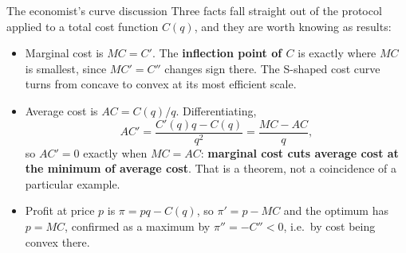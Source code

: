 \begin{rulebox}{The economist's curve discussion}
Three facts fall straight out of the protocol applied to a total cost
function $C(q)$, and they are worth knowing as results:
\begin{itemize}[leftmargin=1.6em,itemsep=0.4ex]
  \item Marginal cost is $MC=C'$. The \textbf{inflection point of $C$} is
        exactly where $MC$ is smallest, since $MC'=C''$ changes sign there.
        The S-shaped cost curve turns from concave to convex at its most
        efficient scale.
  \item Average cost is $AC=C(q)/q$. Differentiating,
        \[
          AC'=\frac{C'(q)q-C(q)}{q^{2}}=\frac{MC-AC}{q},
        \]
        so $AC'=0$ exactly when $MC=AC$: \textbf{marginal cost cuts average
        cost at the minimum of average cost}. That is a theorem, not a
        coincidence of a particular example.
  \item Profit at price $p$ is $\pi=pq-C(q)$, so $\pi'=p-MC$ and the
        optimum has $p=MC$, confirmed as a maximum by $\pi''=-C''<0$,
        i.e.\ by cost being convex there.
\end{itemize}
\end{rulebox}

